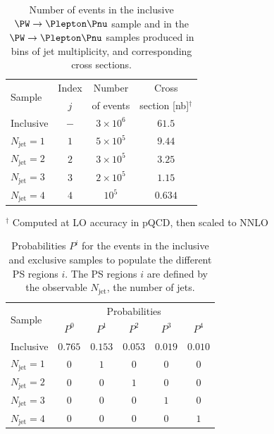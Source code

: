 \documentclass[twocolumn,epjc3]{svjour3}
\newcommand{\jet}{\ensuremath{\textrm{jet}}\xspace}
\begin{document}
\begin{table}
\caption{
  Number of events in the inclusive $\PW \to \Plepton\Pnu$ sample and in the $\PW \to \Plepton\Pnu$ samples produced in bins of jet multiplicity,
  and corresponding cross sections.
}
\label{tab:samples_WJets_vs_Njet}
\begin{center}
\begin{tabular}{l|c|c|c}
\hline
\multirow{2}{12mm}{Sample} & Index & Number    & Cross                    \\
                           & $j$   & of events & section [nb]$^{\dagger}$ \\
\hline
Inclusive                  & $-$   & $3 \times 10^{6}$ & $61.5$           \\
\hline
$N_{\jet} = 1$             & $1$   & $5 \times 10^{5}$ & $9.44$           \\
$N_{\jet} = 2$             & $2$   & $3 \times 10^{5}$ & $3.25$           \\
$N_{\jet} = 3$             & $3$   & $2 \times 10^{5}$ & $1.15$           \\
$N_{\jet} = 4$             & $4$   & $         10^{5}$ & $0.634$          \\
\hline
\end{tabular}
\end{center}
$^{\dagger}$ Computed at LO accuracy in pQCD, then scaled to NNLO
\end{table}

\begin{table}
\caption{
  Probabilities $P^{i}$ for the events in the inclusive and exclusive samples to populate the different PS regions $i$.
  The PS regions $i$ are defined by the observable $N_{\jet}$, the number of jets.
}
\label{tab:probabilities_WJets_vs_Njet}
\begin{center}
\begin{tabular}{l|ccccc}
\hline
\multirow{2}{12mm}{Sample} & \multicolumn{5}{c}{Probabilities}               \\
                           & $P^{0}$ & $P^{1}$ & $P^{2}$ & $P^{3}$ & $P^{4}$ \\
\hline
Inclusive                  & $0.765$ & $0.153$ & $0.053$ & $0.019$ & $0.010$ \\
\hline
$N_{\jet} = 1$             & $0$     & $1$     & $0$     & $0$     & $0$     \\
$N_{\jet} = 2$             & $0$     & $0$     & $1$     & $0$     & $0$     \\
$N_{\jet} = 3$             & $0$     & $0$     & $0$     & $1$     & $0$     \\
$N_{\jet} = 4$             & $0$     & $0$     & $0$     & $0$     & $1$     \\
\hline
\end{tabular}
\end{center}
\end{table}
\end{document}
